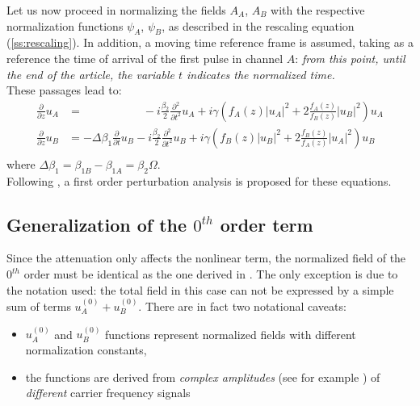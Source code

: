 \documentclass[10pt, lettersize, journal, onecolumn]{IEEEtran}
\begin{document}
Let us now proceed in normalizing the fields $A_A$, $A_B$ with the respective normalization functions $\psi_A$, $\psi_B$, as described in the rescaling equation (\ref{ss:rescaling}).
In addition, a moving time reference frame is assumed, taking as a reference the time of arrival of the first pulse in channel $A$: \textit{from this point, until the end of the article, the variable $t$ indicates the normalized time.}\\
These passages lead to:
\begin{align}\label{eq:u}
    \frac{\partial}{\partial z} u_A &= \qquad \qquad \quad \; - i \frac{\beta_2}{2} \frac{\partial^2}{\partial t^2} u_A + i \gamma \left(f_A(z)|u_A|^2 + 2 \frac{f_A(z)}{f_B(z)} |u_B|^2 \right)u_A \\
    \frac{\partial}{\partial z} u_B &= - \Delta \beta_1 \frac{\partial}{\partial t} u_B - i \frac{\beta_2}{2} \frac{\partial^2}{\partial t^2} u_B + i \gamma \left(f_B(z)|u_B|^2 +2 \frac{f_B(z)}{f_A(z)}|u_A|^2\right)u_B \\
\end{align}
where $\Delta \beta_1 = \beta_{1B} - \beta_{1A} = \beta_2 \Omega$. \\
Following \cite{Dar_2013}, a first order perturbation analysis is proposed for these equations.

\subsection{Generalization of the $0^{th}$ order term}
Since the attenuation only affects the nonlinear term, the normalized field of the $0^{th}$ order must be identical as the one derived in \cite[eq. 1]{Dar_2013}. The only exception is due to the notation used: the total field in this case can not be expressed by a simple sum of terms $u_A^{(0)}+u_B^{(0)}$. There are in fact two notational caveats:
\begin{itemize}
 \item $u_A^{(0)}$ and $u_B^{(0)}$ functions represent normalized fields with different normalization constants,
 \item the functions are derived from \textit{complex amplitudes} (see for example \cite[pp. 523-525]{Someda}) of \textit{different} carrier frequency signals
\end{itemize}
\end{document}
